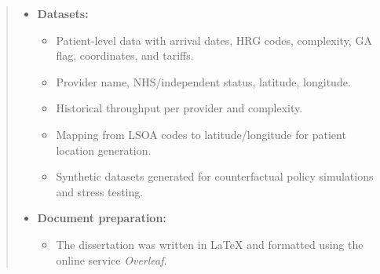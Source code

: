 \documentclass[ %
                    author={Nattanan Nawakitbamrung},
                supervisor={Dr. Sébastien Rochat},
                    degree={MSc},
                     title={Developing and Evaluating the Impact of a Single Patient Treatment List (PTL) for an NHS Integrated Care System},
                  subtitle={},
                      type={},
                      year={2025}]{dissertation}
\begin{document}
\begin{quote}
\begin{itemize}
    \item \textbf{Datasets:}
    \begin{itemize}
        \item Patient-level data with arrival dates, HRG codes, complexity, GA flag, coordinates, and tariffs.
        \item Provider name, NHS/independent status, latitude, longitude.
        \item Historical throughput per provider and complexity.
        \item Mapping from LSOA codes to latitude/longitude for patient location generation.
        \item Synthetic datasets generated for counterfactual policy simulations and stress testing.
    \end{itemize}

    \item \textbf{Document preparation:}
    \begin{itemize}
        \item The dissertation was written in \LaTeX{} and formatted using the online service \emph{Overleaf}.
    \end{itemize}
\end{itemize}

\end{quote}





\end{document}
